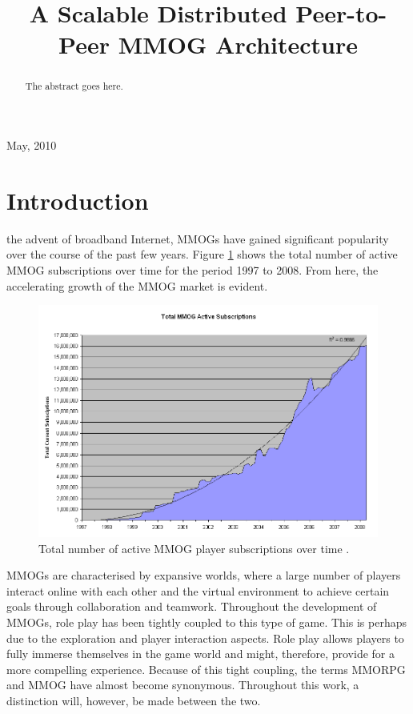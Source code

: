 \documentclass[journal,oneside,a4paper,onecolumn]{IEEEtran}
\begin{document}
%
\title{A Scalable Distributed Peer-to-Peer MMOG Architecture}

\author{
}

\maketitle

\begin{abstract}
The abstract goes here.
\end{abstract}

\hfill May, 2010

\section{Introduction}


 the advent of broadband Internet, \acp{MMOG} have gained significant popularity over the course of the past few years.
Figure \ref{fig_mmog_subscriptions} shows the total number of active MMOG subscriptions over time for the period 1997 to 2008. From here, the accelerating growth of the MMOG market is evident.
%
\begin{figure}[htbp]
 \centering
 \includegraphics[width=0.7\columnwidth]{MMOG_subscriptions}
 \caption{Total number of active MMOG player subscriptions over time \cite{mmo_growth_chart}.}
 \label{fig_mmog_subscriptions}
\end{figure}

\acp{MMOG} are characterised by expansive worlds, where a large number of players interact online with each other and the virtual environment to achieve certain goals through collaboration and teamwork. Throughout the development of \acp{MMOG}, role play has been tightly coupled to this type of game. This is perhaps due to the exploration and player interaction aspects. Role play allows players to fully immerse themselves in the game world and might, therefore, provide for a more compelling experience. Because of this tight coupling, the terms \ac{MMORPG} and \ac{MMOG} have almost become synonymous. Throughout this work, a distinction will, however, be made between the two.
\end{document}
